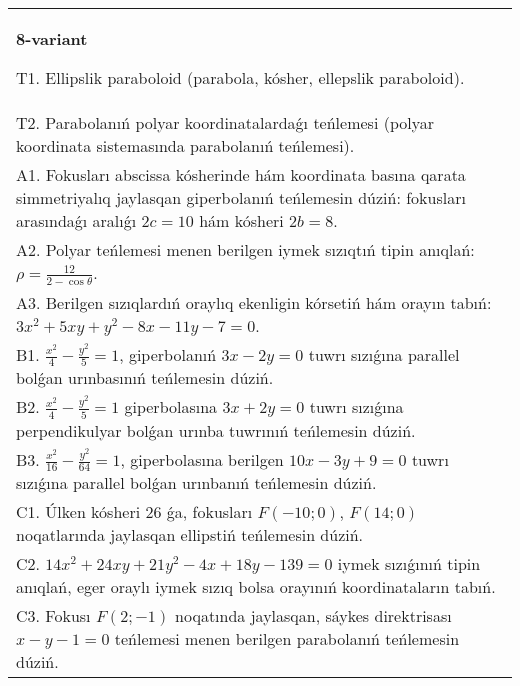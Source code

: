 \documentclass{article}
\begin{document}
\begin{tabular}{m{17cm}}
\textbf{8-variant}
\newline

T1. Ellipslik paraboloid (parabola, kósher, ellepslik paraboloid).\\

T2. Parabolanıń polyar koordinatalardaǵı teńlemesi (polyar koordinata sistemasında parabolanıń teńlemesi).\\

A1. Fokusları abscissa kósherinde hám koordinata basına qarata simmetriyalıq jaylasqan giperbolanıń teńlemesin dúziń: fokusları arasındaǵı aralıǵı $2 c=10$ hám kósheri $2 b=8$.\\

A2. Polyar teńlemesi menen berilgen iymek sızıqtıń tipin anıqlań: $\rho=\frac{12}{2-\cos\theta}$.\\

A3. Berilgen sızıqlardıń oraylıq ekenligin kórsetiń hám orayın tabıń: $3 x^{2}+5 xy+y^{2}-8 x-11 y-7=0$.\\

B1. $\frac{x^{2}}{4} - \frac{y^{2}}{5} = 1$, giperbolanıń $3x - 2y = 0$ tuwrı sızıǵına parallel bolǵan urınbasınıń teńlemesin dúziń.  \\

B2. $\frac{x^{2}}{4} - \frac{y^{2}}{5} = 1$ giperbolasına $3x + 2y = 0$ tuwrı sızıǵına perpendikulyar bolǵan urınba tuwrınıń teńlemesin dúziń.\\

B3. $\frac{x^{2}}{16} - \frac{y^{2}}{64} = 1$, giperbolasına berilgen $10x - 3y + 9 = 0$ tuwrı sızıǵına parallel bolǵan urınbanıń teńlemesin dúziń.  \\

C1. Úlken kósheri 26 ǵa, fokusları $F( - 10;0)$, $F(14;0)$ noqatlarında jaylasqan ellipstiń teńlemesin dúziń.  \\

C2. $14x^{2} + 24xy + 21y^{2} - 4x + 18y - 139 = 0$ iymek sızıǵınıń tipin anıqlań, eger oraylı iymek sızıq bolsa orayınıń koordinataların tabıń.  \\

C3. Fokusı $F(2; - 1)$ noqatında jaylasqan, sáykes direktrisası $x - y - 1 = 0$ teńlemesi menen berilgen parabolanıń teńlemesin dúziń.  \\

\end{tabular}
\vspace{1cm}
\end{document}
